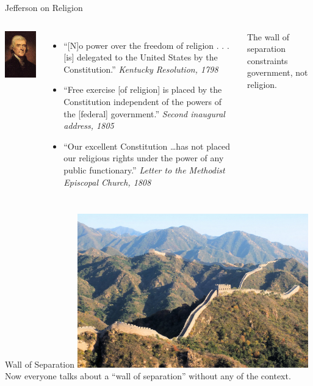\begin{frame}{Jefferson on Religion}
    \begin{columns}[onlytextwidth]
            \centering
            \includegraphics[height=0.75\textheight]{img/jefferson.png} \\

            \begin{itemize}
                \item ``[N]o power over the freedom of religion . . . [is] delegated to the United States by the Constitution.'' \textit{Kentucky Resolution, 1798}
                \item ``Free exercise [of religion] is placed by the Constitution independent of the powers of the [federal] government.'' \textit{Second inaugural address, 1805}
                \item ``Our excellent Constitution \ldots has not placed our religious rights under the power of any public functionary.'' \textit{Letter to the Methodist Episcopal Church, 1808}
            \end{itemize}
            The wall of separation constraints government, not religion.
    \end{columns}
\end{frame}

\begin{frame}{Wall of Separation}
    \centering
    \includegraphics[width=0.75\textwidth]{img/great-wall.jpg} \\
    Now everyone talks about a ``wall of separation'' without any of the context.
\end{frame}

